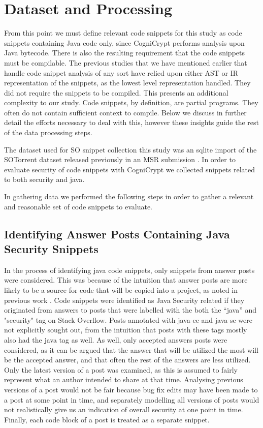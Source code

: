 \documentclass[10pt, conference]{IEEEtran}
\begin{document}
\section{Dataset and Processing}



From this point we must define relevant code snippets for this study as code snippets containing Java code only, since CogniCrypt performs analysis upon Java bytecode. There is also the resulting requirement that the code snippets must be compilable. The previous studies that we have mentioned earlier that handle code snippet analysis of any sort have relied upon either AST or IR representation of the snippets, as the lowest level representation handled. They did not require the snippets to be compiled. This presents an additional complexity to our study. Code snippets, by definition, are partial programs. They often do not contain sufficient context to compile. Below we discuss in further detail the efforts necessary to deal with this, however these insights guide the rest of the data processing steps.

The dataset used for SO snippet collection this study was an sqlite import \cite{wong_2019} of the SOTorrent dataset released previously in an MSR submission \cite{DBLP:conf/msr/BaltesDT008}. In order to evaluate security of code snippets with CogniCrypt we collected snippets related to both security and java. 

In gathering data we performed the following steps in order to gather a relevant and reasonable set of code snippets to evaluate.

\subsection{Identifying Answer Posts Containing Java Security Snippets}
In the process of identifying java code snippets, only snippets from answer posts were considered. This was because of the intuition that answer posts are more likely to be a source for code that will be copied into a project, as noted in previous work \cite{7958574}. Code snippets were identified as Java Security related if they originated from answers to posts that were labelled with the both the “java” and "security" tag on Stack Overflow. Posts annotated with java-ee and java-se were not explicitly sought out, from the intuition that posts with these tags mostly also had the java tag as well. As well, only accepted answers posts were considered, as it can be argued that the answer that will be utilized the most will be the accepted answer, and that often the rest of the answers are less utilized. Only the latest version of a post was examined, as this is assumed to fairly represent what an author intended to share at that time. Analysing previous versions of a post would not be fair because bug fix edits may have been made to a post at some point in time, and separately modelling all versions of posts would not realistically give us an indication of overall security at one point in time. Finally, each code block of a post is treated as a separate snippet.  
\end{document}
